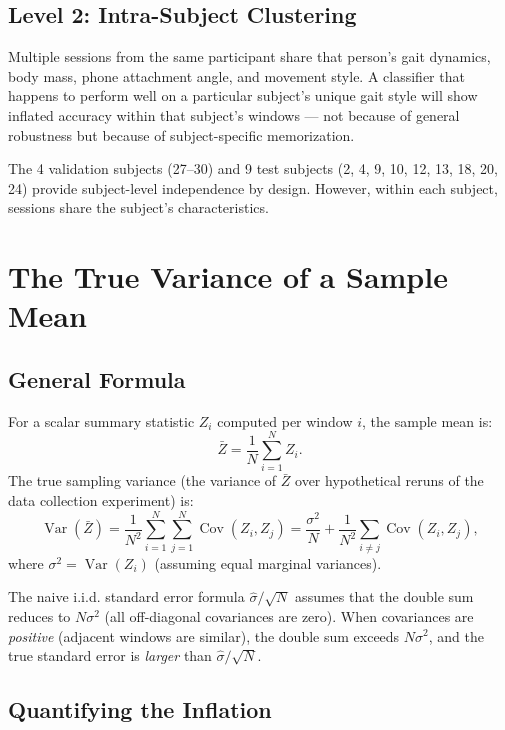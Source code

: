 \documentclass[11pt, a4paper]{article}
\theoremstyle{definition}
\theoremstyle{plain}
\newcommand{\Cov}{\operatorname{Cov}}
\newcommand{\Var}{\operatorname{Var}}
\begin{document}
\subsection{Level 2: Intra-Subject Clustering}

Multiple sessions from the same participant share that person's gait dynamics,
body mass, phone attachment angle, and movement style. A classifier that happens
to perform well on a particular subject's unique gait style will show inflated
accuracy within that subject's windows — not because of general robustness but
because of subject-specific memorization.

The 4 validation subjects (27--30) and 9 test subjects (2, 4, 9, 10, 12, 13,
18, 20, 24) provide subject-level independence by design. However, within each
subject, sessions share the subject's characteristics.

\section{The True Variance of a Sample Mean}

\subsection{General Formula}

For a scalar summary statistic $Z_i$ computed per window $i$, the sample mean is:
\[
  \bar{Z} = \frac{1}{N} \sum_{i=1}^N Z_i.
\]
The true sampling variance (the variance of $\bar{Z}$ over hypothetical reruns
of the data collection experiment) is:
\begin{equation}\label{eq:true_var}
  \Var(\bar{Z})
  = \frac{1}{N^2} \sum_{i=1}^N \sum_{j=1}^N \Cov(Z_i, Z_j)
  = \frac{\sigma^2}{N} + \frac{1}{N^2} \sum_{i \ne j} \Cov(Z_i, Z_j),
\end{equation}
where $\sigma^2 = \Var(Z_i)$ (assuming equal marginal variances).

The naive i.i.d. standard error formula $\hat{\sigma}/\sqrt{N}$ assumes that
the double sum reduces to $N\sigma^2$ (all off-diagonal covariances are zero).
When covariances are \emph{positive} (adjacent windows are similar), the double sum
exceeds $N\sigma^2$, and the true standard error is \emph{larger} than $\hat{\sigma}/\sqrt{N}$.

\subsection{Quantifying the Inflation}
\end{document}
